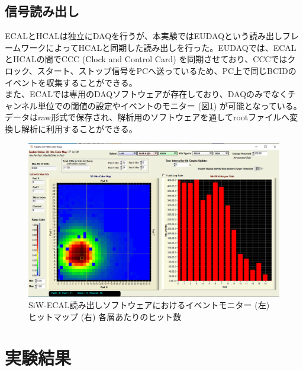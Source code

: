 \subsection{信号読み出し}
ECALとHCALは独立にDAQを行うが、本実験ではEUDAQという読み出しフレームワークによってHCALと同期した読み出しを行った。EUDAQでは、ECALとHCALの間でCCC (Clock and Control Card) を同期させており、CCCではクロック、スタート、ストップ信号をPCへ送っているため、PC上で同じBCIDのイベントを収集することができる。\\
また、ECALでは専用のDAQソフトウェア\cite{ecalsoft}が存在しており、DAQのみでなくチャンネル単位での閾値の設定やイベントのモニター (図\ref{monitor}) が可能となっている。データはraw形式で保存され、解析用のソフトウェアを通してrootファイルへ変換し解析に利用することができる。
\begin{figure}[h]
\begin{center}
 \includegraphics[keepaspectratio, scale=0.2]
 	{Figure/Beamtest/monitor.png}
 		\caption{SiW-ECAL読み出しソフトウェアにおけるイベントモニター (左) ヒットマップ (右) 各層あたりのヒット数}
		\label{monitor}
\end{center}
\end{figure}
\section{実験結果}
